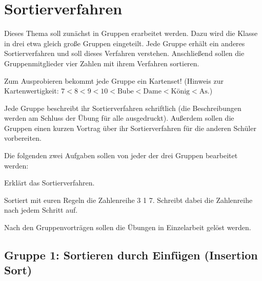 \chapter{Sortierverfahren}
\renewcommand{\chaptertitle}{Sortierverfahren}

\lehead[]{\normalfont\sffamily\hspace*{-2.00cm}\textcolor{white}{\colorbox{lightblue}{\makebox[1.60cm][r]{\thechapter}}}\hspace{0.17cm}\textcolor{lightblue}{\chaptertitle}}
\rohead[]{\textcolor{lightblue}{\chaptertitle}\normalfont\sffamily\hspace*{0.17cm}\textcolor{white}{\colorbox{lightblue}{\makebox[1.60cm][l]{\thechapter}}}\hspace{-2.00cm}}
\rehead[]{\textcolor{lightblue}{AvHG, Inf, My}}
\lohead[]{\textcolor{lightblue}{AvHG, Inf, My}}

\lstset{style=myJava}

Dieses Thema soll zunächst in Gruppen erarbeitet werden. Dazu wird die Klasse in
drei etwa gleich große Gruppen eingeteilt. Jede Gruppe erhält ein anderes
Sortierverfahren und soll dieses Verfahren verstehen. Anschließend sollen die
Gruppenmitglieder vier Zahlen mit ihrem Verfahren sortieren.

Zum Ausprobieren bekommt jede Gruppe ein Kartenset! (Hinweis zur
Kartenwertigkeit: $7 < 8 < 9 < 10 < \text{Bube} < \text{Dame} < \text{König} < \text{As}$.)

Jede Gruppe beschreibt ihr Sortierverfahren schriftlich (die Beschreibungen
werden am Schluss der Übung für alle ausgedruckt). Außerdem sollen die Gruppen
einen kurzen Vortrag über ihr Sortierverfahren für die anderen Schüler
vorbereiten.

Die folgenden zwei Aufgaben sollen von jeder der drei Gruppen bearbeitet werden:

\begin{compactenum}[a)]
\item Erklärt das Sortierverfahren.
\item Sortiert mit euren Regeln die Zahlenreihe  3 1 7\grqq . Schreibt dabei die Zahlenreihe nach jedem Schritt auf.
\end{compactenum}

Nach den Gruppenvorträgen sollen die Übungen in Einzelarbeit gelöst werden.

\clearpage

\section{Gruppe 1: Sortieren durch Einfügen (Insertion Sort)}


